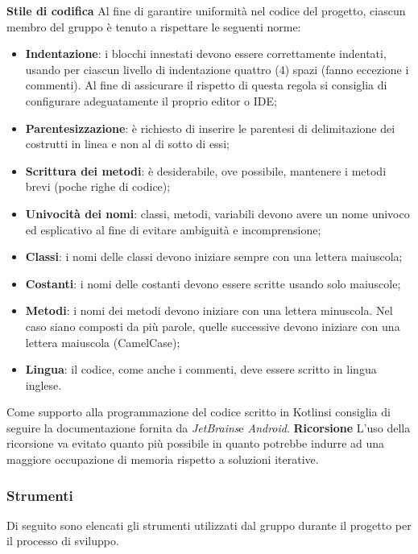 			\textbf{Stile di codifica} \newline \newline
			Al fine di garantire uniformità nel codice del progetto, ciascun membro del gruppo è
			tenuto a rispettare le seguenti norme:
			\begin{itemize}
				\item \textbf{Indentazione}: i blocchi innestati devono essere correttamente indentati, usando per ciascun livello di indentazione quattro (4) spazi (fanno eccezione i commenti). Al fine di assicurare il rispetto di questa regola si consiglia di configurare adeguatamente il proprio editor o IDE;
				\item \textbf{Parentesizzazione}: è richiesto di inserire le parentesi di delimitazione dei costrutti in linea e non al di sotto di essi;
				\item \textbf{Scrittura dei metodi}: è desiderabile, ove possibile, mantenere i metodi brevi (poche righe di codice);
				\item \textbf{Univocità dei nomi}: classi, metodi, variabili devono avere un nome univoco	 ed esplicativo al fine di evitare ambiguità e incomprensione;
				\item \textbf{Classi}: i nomi delle classi devono iniziare sempre con una lettera maiuscola;
				\item \textbf{Costanti}: i nomi delle costanti devono essere scritte usando solo maiuscole;
				\item \textbf{Metodi}: i nomi dei metodi devono iniziare con una lettera minuscola. Nel caso
				siano composti da più parole, quelle successive devono iniziare con una lettera maiuscola (CamelCase\glo{});
				\item \textbf{Lingua}: il codice, come anche i commenti, deve essere scritto in lingua inglese.
			\end{itemize}
			Come supporto alla programmazione del codice scritto in Kotlin\glosp si consiglia di seguire la documentazione fornita da \textit{JetBrains}\glosp e \textit{Android}\glo. \newline \newline
			\textbf{Ricorsione} \newline \newline
			L'uso della ricorsione va evitato quanto più possibile in  quanto  potrebbe
			indurre  ad  una  maggiore  occupazione  di  memoria  rispetto  a  soluzioni
			iterative.
	\subsubsection{Strumenti}
	Di seguito sono elencati gli strumenti utilizzati dal gruppo durante il progetto per il processo di sviluppo.	
